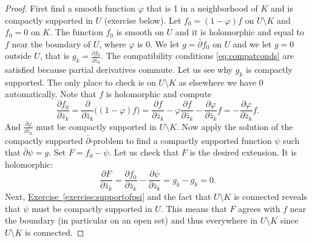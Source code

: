 \documentclass[12pt,openany]{book}
\theoremstyle{plain}
\theoremstyle{remark}
\theoremstyle{definition}
\theoremstyle{exercise}
\theoremstyle{example}
\newcommand{\exerciseref}[1]{\hyperref[#1]{Exercise~\ref*{#1}}}
\begin{document}
\begin{proof}
First find a smooth function $\varphi$ that is 1 in a neighborhood of
$K$ and is compactly supported in $U$ (exercise below).  Let
$f_0 = (1-\varphi)f$ on $U \setminus K$ and $f_0 = 0$ on $K$.  The function $f_0$
is smooth on $U$ and it is holomorphic
and equal to $f$ near the boundary of $U$, where $\varphi$ is 0.
We let $g = \bar{\partial} f_0$ on $U$ and we let $g=0$ outside $U$, that is $g_k = \frac{\partial
f_0}{\partial \bar{z}_k}$.  The compatibility conditions
\eqref{eq:compatconds} are satisfied
because partial derivatives commute.
Let us see why $g_k$ is compactly supported.  The
only place to check is on $U \setminus K$ as elsewhere we have 0
automatically.  Note that $f$ is holomorphic and compute
\begin{equation*}
\frac{\partial f_0}{\partial \bar{z}_k}
=
\frac{\partial }{\partial \bar{z}_k}
\bigl((1-\varphi)f\bigr)
=
\frac{\partial f}{\partial \bar{z}_k}
- \varphi \frac{\partial f}{\partial \bar{z}_k}
- \frac{\partial \varphi}{\partial \bar{z}_k} f
=
- \frac{\partial \varphi}{\partial \bar{z}_k} f .
\end{equation*}
And 
$\frac{\partial \varphi}{\partial \bar{z}_k}$ must be compactly supported in
$U \setminus K$.
Now apply the solution of the compactly supported $\bar{\partial}$-problem
to find a
compactly supported function $\psi$ such that $\bar{\partial}\psi = g$. 
Set $F = f_0 - \psi$.  Let us check that $F$ is the desired
extension.  It is holomorphic:
\begin{equation*}
\frac{\partial F}{\partial \bar{z}_k}
=
\frac{\partial f_0}{\partial \bar{z}_k}
-
\frac{\partial \psi}{\partial \bar{z}_k}
=
g_k
-
g_k
= 0 .
\end{equation*}
Next, \exerciseref{exercise:supportofpsi} and the fact that $U \setminus
K$ is connected reveals that $\psi$ must be compactly supported in $U$.
This means that $F$ agrees with $f$ near the boundary (in particular
on an open set) and thus everywhere in $U \setminus K$ since $U \setminus K$
is connected.
\end{proof}
\end{document}

